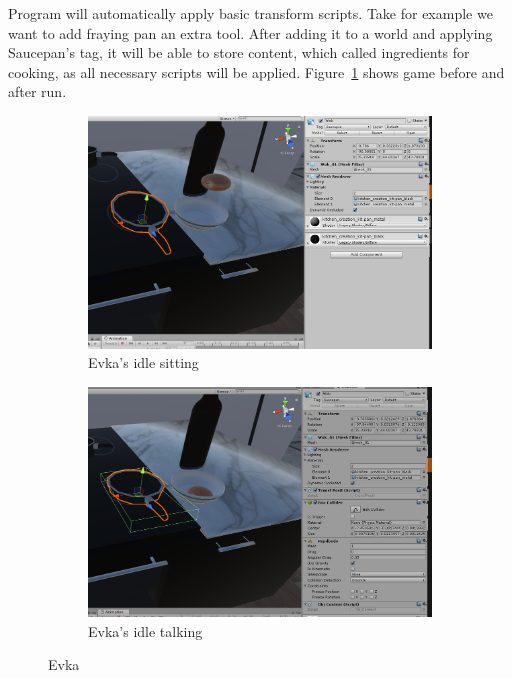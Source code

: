 \documentclass[18pt]{article}
\numberwithin{equation}{section} %
\numberwithin{figure}{section} %
\numberwithin{table}{section} %
\begin{document}
		Program will automatically apply basic transform scripts. Take for example we want to add fraying pan an extra tool. After adding it to a world and applying Saucepan's tag, it will be able to store content, which called ingredients for cooking, as all necessary scripts will be applied. Figure~\ref{fig:add_franpan} shows game before and after run. \\
		
		\begin{figure}[H]
			\centering
			\begin{subfigure}{0.45\textwidth}
				\centering
				\includegraphics[width=1\linewidth]{images/franpan}
				\caption{Evka's idle sitting}
			\end{subfigure}
			\begin{subfigure}{0.45\textwidth}
				\centering
				\includegraphics[width=1\linewidth]{images/franpan_script}
				\caption{Evka's idle talking}
			\end{subfigure}		
			\caption{Evka}
			\label{fig:add_franpan}
		\end{figure}
		
\end{document}
